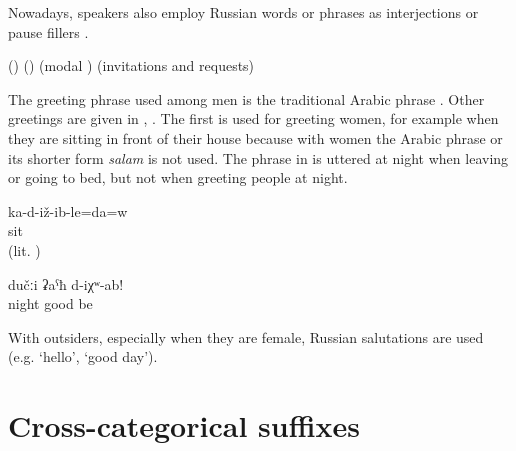 Nowadays, speakers also employ Russian words or phrases as interjections or pause fillers .

\begin{exe}
	\ex	\label{ex:Russian fillers minor}
	\begin{xlist}
		\ex	{} 		
		\ex	{}  ()	
		\ex	{}  ()	
		\ex	{} 	
		\ex	{} 	
		\ex	{} (modal )
		\ex {}  (invitations and requests)	
	\end{xlist}
\end{exe}

The greeting phrase used among men is the traditional Arabic phrase . Other greetings are given in , . The first is used for greeting women, for example when they are sitting in front of their house because with women the Arabic phrase or its shorter form \textit{salam} is not used. The phrase in  is uttered at night when leaving or going to bed, but not when greeting people at night. 

\begin{exe}
	\ex	\label{ex:Are you sitting minor}
	\gll	ka-d-iž-ib-le=da=w\\
		sit\\
	\glt	{} (lit. )

	\ex	\label{ex:‎‎‎Good night minor}
	\gll	dučːi	ʡaˁħ	d-iχʷ-ab!\\
		night	good	be\\
	\glt	{}
\end{exe}

With outsiders, especially when they are female, Russian salutations are used (e.g.  `hello',  `good day').





\section{Cross-categorical suffixes}
\label{sec:Cross-categorical derivational suffixes}

